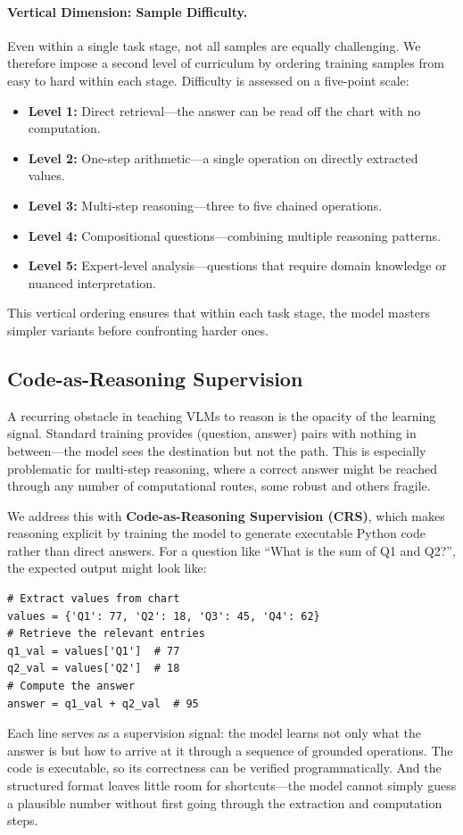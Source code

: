 ﻿\documentclass[journal]{IEEEtran}
\newcommand{\crs}{CRS}
\begin{document}
\paragraph{Vertical Dimension: Sample Difficulty.}
Even within a single task stage, not all samples are equally challenging. We therefore impose a second level of curriculum by ordering training samples from easy to hard within each stage. Difficulty is assessed on a five-point scale:
\begin{itemize}
    \item \textbf{Level 1:} Direct retrieval---the answer can be read off the chart with no computation.
    \item \textbf{Level 2:} One-step arithmetic---a single operation on directly extracted values.
    \item \textbf{Level 3:} Multi-step reasoning---three to five chained operations.
    \item \textbf{Level 4:} Compositional questions---combining multiple reasoning patterns.
    \item \textbf{Level 5:} Expert-level analysis---questions that require domain knowledge or nuanced interpretation.
\end{itemize}
This vertical ordering ensures that within each task stage, the model masters simpler variants before confronting harder ones.

\subsection{Code-as-Reasoning Supervision}
\label{sec:crs}
A recurring obstacle in teaching VLMs to reason is the opacity of the learning signal. Standard training provides (question, answer) pairs with nothing in between---the model sees the destination but not the path. This is especially problematic for multi-step reasoning, where a correct answer might be reached through any number of computational routes, some robust and others fragile.

We address this with \textbf{Code-as-Reasoning Supervision (\crs{})}, which makes reasoning explicit by training the model to generate executable Python code rather than direct answers. For a question like ``What is the sum of Q1 and Q2?'', the expected output might look like:
\begin{small}
\begin{verbatim}
# Extract values from chart
values = {'Q1': 77, 'Q2': 18, 'Q3': 45, 'Q4': 62}
# Retrieve the relevant entries
q1_val = values['Q1']  # 77
q2_val = values['Q2']  # 18
# Compute the answer
answer = q1_val + q2_val  # 95
\end{verbatim}
\end{small}
Each line serves as a supervision signal: the model learns not only what the answer is but how to arrive at it through a sequence of grounded operations. The code is executable, so its correctness can be verified programmatically. And the structured format leaves little room for shortcuts---the model cannot simply guess a plausible number without first going through the extraction and computation steps.
\end{document}
